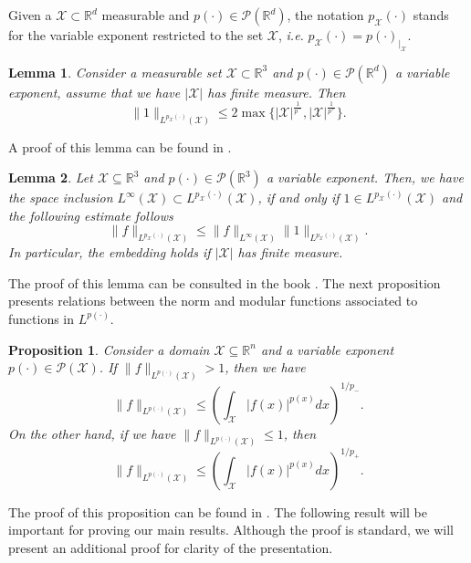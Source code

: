 \documentclass[a4paper,12pt]{amsart}
\theoremstyle{definition}
\theoremstyle{plain}
\newtheorem{proposition}{Proposition}[section]
\newtheorem{lemma}{Lemma}[section]
\def\R{\mathbb{R}}
\def\R{\mathbb R}
\def\Rt{\mathbb{R}^d}
\begin{document}
Given a  $ \mathcal{X} \subset \Rt$  measurable and   $p(\cdot) \in \mathcal{P}(\Rt)$,  the notation 
$p_\mathcal{X}(\cdot)$ stands for the variable exponent restricted to the set $\mathcal{X}$, \emph{i.e.} ${p}_\mathcal{X}(\cdot)=  p  (\cdot)_{|_{\mathcal{X}}}$. 
\begin{lemma}\label{PropositionLpplusminus}
Consider a measurable set $\mathcal{X}\subset \R^3$ and $p(\cdot)\in \mathcal{P}(\Rt)$ a variable exponent, assume that we have $|\mathcal{X}|$ has finite measure.  Then 
$$\|1\|_{L^{p_{\mathcal{X}}(\cdot) }(\mathcal{X})}\leq 2\max\{|\mathcal{X}|^{\frac 1{ p^-}},|\mathcal{X}|^{\frac 1{p^+}}\}.$$
\end{lemma}
A proof of this lemma can be found in \cite[Lemma 3.2.12]{Diening_Libro}.  
\begin{lemma}\label{lemmaLinftyLpvariable}
Let $\mathcal{X}\subseteq \R^3$ and $p(\cdot)\in \mathcal{P}(\mathbb{R}^3)$ a variable exponent. Then, we have the space inclusion $L^{\infty} (\mathcal{X}) \subset L^{p_{\mathcal{X}}(\cdot)} (\mathcal{X})$, if and only if $1\in  L^{p_{\mathcal{X}}(\cdot)} (\mathcal{X}) $ and  the following estimate follows
$$\|f\|_{L^{p_{\mathcal{X}}(\cdot)} (\mathcal{X})}\leq \|f\|_{L^\infty(\mathcal{X})}\|1\|_{L^{p_{\mathcal{X}}(\cdot)} (\mathcal{X})}.$$
In particular, the embedding holds if $|\mathcal{X}|$ has finite measure. 
\end{lemma}
The proof of this lemma can be consulted in the book \cite[Proposition 2.43]{CRUZ}. 
The next proposition presents relations between the norm  and modular functions associated to functions in $L^{p(\cdot)}$. 
%
\begin{proposition} \label{proposition.utendzero}
Consider a domain $\mathcal{X} \subseteq \R^n$ and  a variable exponent $p(\cdot) \in \mathcal{P}(\mathcal{X})$. If $\|f\|_{L^{p(\cdot)}(\mathcal{X})} > 1$, then we have 
\[
 \|f\|_{L^{p(\cdot)}(\mathcal{X})} \leq \left(\int_{\mathcal{X}} |f(x)|^{p(x)}dx \right)^{1/p_-}.
\]
On the other hand, if we have $\|f\|_{L^{p(\cdot)}(\mathcal{X})} \leq 1$, then
\[
 \|f\|_{L^{p(\cdot)}(\mathcal{X})} \leq \left(\int_{\mathcal{X}} |f(x)|^{p(x)}dx \right)^{1/p_+}.
\] 
\end{proposition}
%
\noindent The proof of this proposition can be found in \cite[Chapter 2, page 25]{CRUZ}.  
The following result will be important for proving our main results. Although the proof is standard, we will present an additional proof for clarity of the presentation.
 
\end{document}
